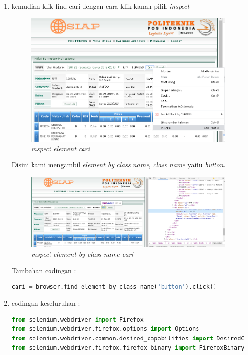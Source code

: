 \begin{enumerate}
\item kemudian klik find cari dengan cara klik kanan pilih \textit{inspect}
\begin{figure}[H]
    	\centering
    	\includegraphics[scale=0.3]{Figures/figures/cari1.png}
    	\caption{\textit{inspect element cari}}
    	\label{CLI}
	\end{figure}
	
Disini kami mengambil \textit{element by class name}, \textit{class name} yaitu \textit{button}.
\begin{figure}[H]
    	\centering
    	\includegraphics[scale=0.3]{Figures/figures/button1.png}
    	\caption{\textit{inspect element by class name cari}}
    	\label{CLI}
	\end{figure}

Tambahan codingan :
\begin{lstlisting}[language=Python]
cari = browser.find_element_by_class_name('button').click()
\end{lstlisting}


\item codingan keseluruhan :
\begin{lstlisting}[language=Python]
from selenium.webdriver import Firefox
from selenium.webdriver.firefox.options import Options
from selenium.webdriver.common.desired_capabilities import DesiredCapabilities
from selenium.webdriver.firefox.firefox_binary import FirefoxBinary


\end{lstlisting}
\end{enumerate}
